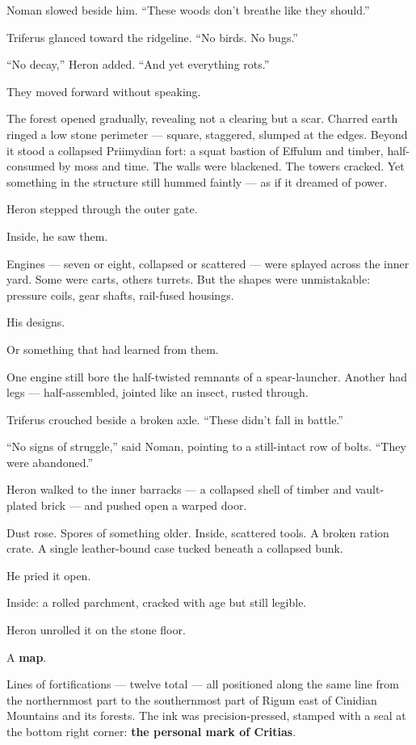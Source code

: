 \documentclass[9pt]{article}
\begin{document}
Noman slowed beside him. “These woods don’t breathe like they should.”

Triferus glanced toward the ridgeline. “No birds. No bugs.”

“No decay,” Heron added. “And yet everything rots.”

They moved forward without speaking.

The forest opened gradually, revealing not a clearing but a scar. Charred earth ringed a low stone perimeter — square, staggered, slumped at the edges. Beyond it stood a collapsed Priimydian fort: a squat bastion of Effulum and timber, half-consumed by moss and time. The walls were blackened. The towers cracked. Yet something in the structure still hummed faintly — as if it dreamed of power.

Heron stepped through the outer gate.

Inside, he saw them.

Engines — seven or eight, collapsed or scattered — were splayed across the inner yard. Some were carts, others turrets. But the shapes were unmistakable: pressure coils, gear shafts, rail-fused housings.

His designs.

Or something that had learned from them.

One engine still bore the half-twisted remnants of a spear-launcher. Another had legs — half-assembled, jointed like an insect, rusted through.

Triferus crouched beside a broken axle. “These didn’t fall in battle.”

“No signs of struggle,” said Noman, pointing to a still-intact row of bolts. “They were abandoned.”

Heron walked to the inner barracks — a collapsed shell of timber and vault-plated brick — and pushed open a warped door.

Dust rose. Spores of something older. Inside, scattered tools. A broken ration crate. A single leather-bound case tucked beneath a collapsed bunk.

He pried it open.

Inside: a rolled parchment, cracked with age but still legible.

Heron unrolled it on the stone floor.

A \textbf{map}.

Lines of fortifications — twelve total — all positioned along the same line from the northernmost part to the southernmost part of Rigum east of Cinidian Mountains and its forests. The ink was precision-pressed, stamped with a seal at the bottom right corner: \textbf{the personal mark of Critias}.
\end{document}
